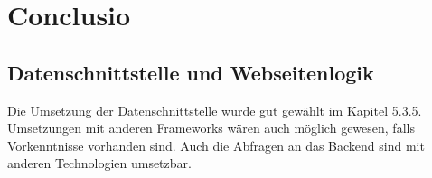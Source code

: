 \chapter{Conclusio} 

\section{Datenschnittstelle und Webseitenlogik}
Die Umsetzung der Datenschnittstelle wurde gut gewählt im Kapitel \hyperref[sec:rfoster_fazit]{5.3.5}. Umsetzungen mit anderen Frameworks wären auch möglich gewesen, falls Vorkenntnisse vorhanden sind. Auch die Abfragen an das Backend sind mit anderen Technologien umsetzbar.
